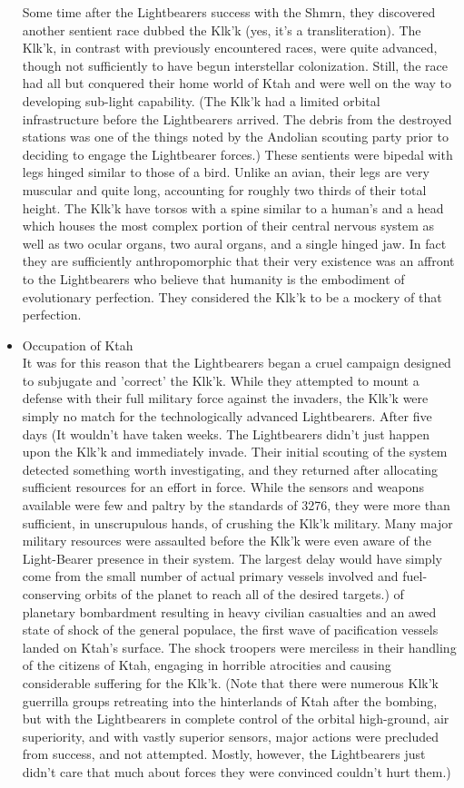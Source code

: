 \begin{itemize}
Some time after the Lightbearers success with the Shmrn, they
discovered another sentient race dubbed the Klk'k (yes, it's a
transliteration).  The Klk'k, in contrast with previously encountered
races, were quite advanced, though not sufficiently to have begun
interstellar colonization.  Still, the race had all but conquered
their home world of Ktah and were well on the way to developing
sub-light capability. (The Klk'k had a limited orbital infrastructure
before the Lightbearers arrived. The debris from the destroyed
stations was one of the things noted by the Andolian scouting party
prior to deciding to engage the Lightbearer forces.)  These sentients
were bipedal with legs hinged similar to those of a bird.  Unlike an
avian, their legs are very muscular and quite long, accounting for
roughly two thirds of their total height.  The Klk'k have torsos with
a spine similar to a human's and a head which houses the most complex
portion of their central nervous system as well as two ocular organs,
two aural organs, and a single hinged jaw.  In fact they are
sufficiently anthropomorphic that their very existence was an affront
to the Lightbearers who believe that humanity is the embodiment of
evolutionary perfection.  They considered the Klk'k to be a mockery of
that perfection.

\item Occupation of Ktah \\

It was for this reason that the Lightbearers began a cruel campaign
designed to subjugate and 'correct' the Klk'k.  While they attempted
to mount a defense with their full military force against the
invaders, the Klk'k were simply no match for the technologically
advanced Lightbearers.  After five days (It wouldn't have taken
weeks. The Lightbearers didn't just happen upon the Klk'k and
immediately invade. Their initial scouting of the system detected
something worth investigating, and they returned after allocating
sufficient resources for an effort in force. While the sensors and
weapons available were few and paltry by the standards of 3276, they
were more than sufficient, in unscrupulous hands, of crushing the Klk'k military. Many major military resources were assaulted before the
Klk'k were even aware of the Light-Bearer presence in their
system. The largest delay would have simply come from the small number
of actual primary vessels involved and fuel-conserving orbits of the
planet to reach all of the desired targets.) of planetary bombardment
resulting in heavy civilian casualties and an awed state of shock of
the general populace, the first wave of pacification vessels landed on
Ktah's surface.  The shock troopers were merciless in their handling
of the citizens of Ktah, engaging in horrible atrocities and causing
considerable suffering for the Klk'k. (Note that there were numerous
Klk'k guerrilla groups retreating into the hinterlands of Ktah after
the bombing, but with the Lightbearers in complete control of the
orbital high-ground, air superiority, and with vastly superior
sensors, major actions were precluded from success, and not
attempted. Mostly, however, the Lightbearers just didn't care that
much about forces they were convinced couldn't hurt them.)


\end{itemize}
